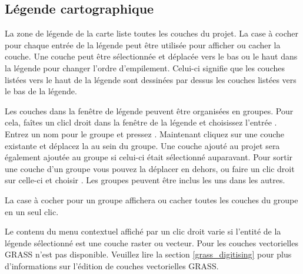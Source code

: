 \subsection{Légende cartographique} \label{label_legend}

La zone de légende de la carte liste toutes les couches du projet. 
La case à cocher pour chaque entrée de la légende peut être utilisée 
pour afficher ou cacher la couche.
Une couche peut être sélectionnée et déplacée vers le bas ou le haut dans la 
légende pour changer l'ordre d'empilement. Celui-ci signifie que les couches 
listées vers le haut de la légende sont dessinées par dessus les couches 
listées vers le bas de la légende.

Les couches dans la fenêtre de légende peuvent être organisées en groupes. Pour 
cela, faîtes un clicl droit dans la fenêtre de la légende et choisissez l'entrée 
. Entrez un nom pour le groupe et pressez 
. Maintenant cliquez sur une couche existante et déplacez la 
au sein du groupe. Une couche ajouté au projet sera également ajoutée au groupe 
si celui-ci était sélectionné auparavant. Pour sortir une couche d'un groupe 
vous pouvez la déplacer en dehors, ou faire un clic droit sur celle-ci et 
choisir . Les groupes peuvent 
être inclus les uns dans les autres.

La case à cocher pour un groupe affichera ou cacher toutes les couches du groupe 
en un seul clic.

Le contenu du menu contextuel affiché par un clic droit varie si l'entité de la 
légende sélectionné est une couche raster ou  vecteur. Pour les couches vectorielles 
GRASS  n'est pas disponible. Veuillez 
lire la section \ref{grass_digitising} pour plus d'informations sur l'édition 
de couches vectorielles GRASS.

